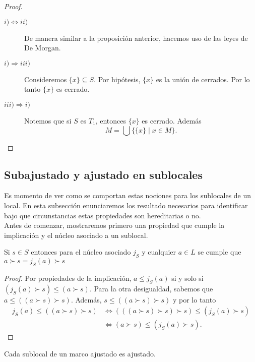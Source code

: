 \documentclass{comunicaciones}
\begin{document}
\begin{proof}
    \begin{description}
        \item[$i)\Leftrightarrow ii)$] De manera similar a la proposición anterior, hacemos uso de las leyes de De Morgan. 
        \item[$i)\Rightarrow iii)$] Consideremos $\{x\}\subseteq S$. Por hipótesis, $\{x\}$ es la unión de cerrados. Por lo tanto $\{x\}$ es cerrado.
        \item[$iii)\Rightarrow i)$] Notemos que si $S$ es $T_1$, entonces $\{x\}$ es cerrado. Además 
        \[
        M=\bigcup\{\{x\}\mid x\in M\}. 
        \]
    \end{description}
\end{proof}

\subsection{Subajustado y ajustado en sublocales}\label{Sajuyaju en Sublocales}

Es momento de ver como se comportan estas nociones para los sublocales de un local. En esta subsección enunciaremos los resultado necesarios para identificar bajo que circunstancias estas propiedades son hereditarias o no.\\

Antes de comenzar, mostraremos primero una propiedad que cumple la implicación y el núcleo asociado a un sublocal. 

\begin{prop}\label{nucleoimplicacion}
    Si $s\in S$ entonces para el núcleo asociado $j_S$ y cualquier $a\in L$ se cumple que $a\succ s=j_S(a)\succ s$
\end{prop}

\begin{proof}
    Por propiedades de la implicación, $a\leq j_S(a)$ si y solo si $(j_S(a)\succ s)\leq (a\succ s)$. Para la otra desigualdad, sabemos que $a\leq ((a\succ s)\succ s)$. Además, $s\leq ((a\succ s)\succ s)$ y por lo tanto  
    \[
    \begin{split}
    j_S(a)\leq ((a\succ s)\succ s) & \Leftrightarrow (((a\succ s)\succ s)\succ s)\leq (j_S(a)\succ s)\\ & \Leftrightarrow (a\succ s)\leq (j_S(a)\succ s).
    \end{split}
    \]
\end{proof}

\begin{prop}\label{aju aju}
    Cada sublocal de un marco ajustado es ajustado.
\end{prop}
\end{document}
